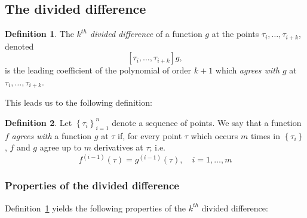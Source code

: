 \documentclass[12pt]{article}
\theoremstyle{definition}
\newtheorem{definition}{Definition}[section]
\begin{document}
\subsection{The divided difference}

\begin{definition}\label{definition:divided_difference}
The \emph{$k^{th}$ divided difference} of a function $g$ at the points $\tau_i,\dots,\tau_{i+k}$, denoted
\[
\left[ \tau_i,\dots,\tau_{i+k} \right]g,
\]
is the leading coefficient of the polynomial of order $k+1$ which \emph{agrees with $g$} at $\tau_i,\dots,\tau_{i+k}$.
\end{definition}
This leads us to the following definition:

\begin{definition}\label{definition:agrees_with_g}
Let $\left\{\tau_i \right\}_{i=1}^n$ denote a sequence of points. We say that a function $f$ \emph{agrees with} a function $g$ at $\tau$ if, for every point $\tau$ which occurs $m$ times in $\left\{\tau_i \right\}$, $f$ and $g$ agree up to $m$ derivatives at $\tau$; i.e.
\[
f^{\left(i-1\right)}\left(\tau\right) = g^{\left(i-1\right)}\left(\tau\right), \quad i=1,\dots,m
\]
\end{definition}

\subsubsection{Properties of the divided difference}
Definition~\ref{definition:divided_difference} yields the following properties of the $k^{th}$ divided difference:
\end{document}
